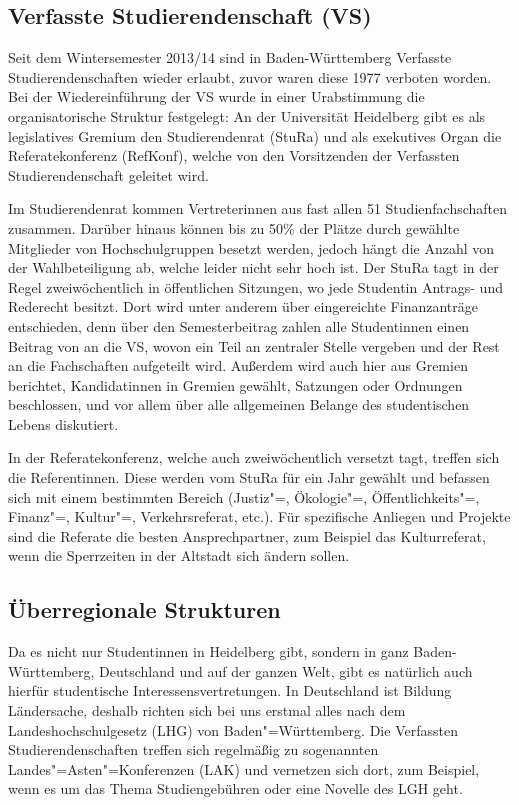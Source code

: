 \vspace{-2mm}
\subsection{Verfasste Studierendenschaft (VS)}
Seit dem Wintersemester 2013/14 sind in Baden-Württemberg Verfasste Studierendenschaften wieder erlaubt, zuvor waren diese 1977 verboten worden.
Bei der Wiedereinführung der VS wurde in einer Urabstimmung die organisatorische Struktur festgelegt:
An der Universität Heidelberg gibt es als legislatives Gremium den Studierendenrat (StuRa) und als exekutives Organ die Referatekonferenz (RefKonf), welche von den Vorsitzenden der Verfassten Studierendenschaft geleitet wird.

Im Studierendenrat kommen Vertreterinnen aus fast allen 51 Studienfachschaften zusammen.
Darüber hinaus können bis zu 50\% der Plätze durch gewählte Mitglieder von Hochschulgruppen besetzt werden, jedoch hängt die Anzahl von der Wahlbeteiligung ab, welche leider nicht sehr hoch ist.
Der StuRa tagt in der Regel zweiwöchentlich in öffentlichen Sitzungen, wo jede Studentin Antrags- und Rederecht besitzt.
Dort wird unter anderem über eingereichte Finanzanträge entschieden, denn über den Semesterbeitrag zahlen alle Studentinnen einen Beitrag von \EUR{\vsbeitrag} an die VS, wovon ein Teil an zentraler Stelle vergeben und der Rest an die Fachschaften aufgeteilt wird.
Außerdem wird auch hier aus Gremien berichtet, Kandidatinnen in Gremien gewählt, Satzungen oder Ordnungen beschlossen, und vor allem über alle allgemeinen Belange des studentischen Lebens diskutiert.

In der Referatekonferenz, welche auch zweiwöchentlich versetzt tagt, treffen sich die Referentinnen.
Diese werden vom StuRa für ein Jahr gewählt und befassen sich mit einem bestimmten Bereich (Justiz"=, Ökologie"=, Öffentlichkeits"=, Finanz"=, Kultur"=, Verkehrsreferat, etc.).
Für spezifische Anliegen und Projekte sind die Referate die besten Ansprechpartner, zum Beispiel das Kulturreferat, wenn die Sperrzeiten in der Altstadt sich ändern sollen.

\subsection{Überregionale Strukturen}
Da es nicht nur Studentinnen in Heidelberg gibt, sondern in ganz Baden-Württemberg, Deutschland und auf der ganzen Welt, gibt es natürlich auch hierfür studentische Interessensvertretungen.
In Deutschland ist Bildung Ländersache, deshalb richten sich bei uns erstmal alles nach dem Landeshochschulgesetz (LHG) von Baden"=Württemberg.
Die Verfassten Studierendenschaften treffen sich regelmäßig zu sogenannten Landes"=Asten"=Konferenzen (LAK) und vernetzen sich dort, zum Beispiel, wenn es um das Thema Studiengebühren oder eine Novelle des LGH geht.

